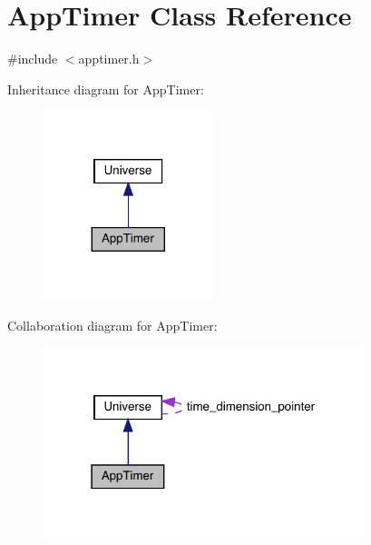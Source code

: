 \hypertarget{class_app_timer}{}\section{App\+Timer Class Reference}
\label{class_app_timer}


{\ttfamily \#include $<$apptimer.\+h$>$}



Inheritance diagram for App\+Timer\+:\nopagebreak
\begin{figure}[H]
\begin{center}
\leavevmode
\includegraphics[width=140pt]{class_app_timer__inherit__graph}
\end{center}
\end{figure}


Collaboration diagram for App\+Timer\+:\nopagebreak
\begin{figure}[H]
\begin{center}
\leavevmode
\includegraphics[width=265pt]{class_app_timer__coll__graph}
\end{center}
\end{figure}
